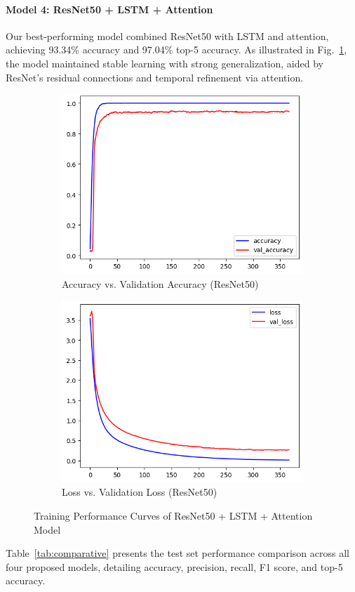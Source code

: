 \documentclass[conference]{IEEEtran}
\begin{document}
\paragraph*{Model 4: ResNet50 + LSTM + Attention}
Our best-performing model combined ResNet50 with LSTM and attention, achieving 93.34\% accuracy and 97.04\% top-5 accuracy. As illustrated in Fig.~\ref{fig:resnet_training}, the model maintained stable learning with strong generalization, aided by ResNet’s residual connections and temporal refinement via attention.

\begin{figure}[htbp] 
\centering 
\begin{subfigure}[b]{0.48\linewidth} \includegraphics[width=\linewidth]{res_acc.png} \caption{Accuracy vs. Validation Accuracy (ResNet50)} \end{subfigure} 
\hfill 
\begin{subfigure}[b]{0.48\linewidth} \includegraphics[width=\linewidth]{res_loss.png} \caption{Loss vs. Validation Loss (ResNet50)} \end{subfigure} 
\caption{Training Performance Curves of ResNet50 + LSTM + Attention Model} 
\label{fig:resnet_training} 
\end{figure} 
Table~\ref{tab:comparative} presents the test set performance comparison across all four proposed models, detailing accuracy, precision, recall, F1 score, and top-5 accuracy.
\end{document}

